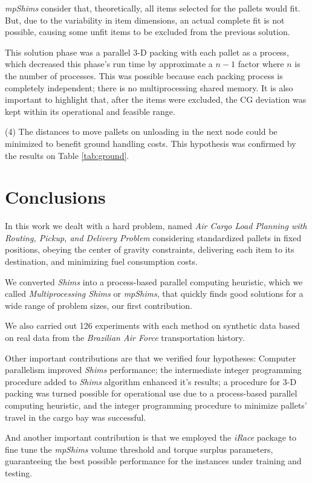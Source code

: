 \documentclass[preprint,authoryear]{elsarticle}
\begin{document}
{\it mpShims} consider that, theoretically, all items selected for the pallets would fit. But, due to the variability in item dimensions, an actual complete fit is not possible, causing some unfit items to be excluded from the previous solution.

This solution phase was a parallel 3-D packing with each pallet as a process, which decreased this phase's run time by approximate a $n-1$ factor where $n$ is the number of processes. This was possible because each packing process is completely independent; there is no multiprocessing shared memory. It is also important to highlight that, after the items were excluded, the CG deviation was kept within its operational and feasible range.

(4) The distances to move pallets on unloading in the next node could be minimized to benefit ground handling costs.
This hypothesis was confirmed by the results on Table \ref{tab:ground}.


\section{Conclusions}
\label{sec7}

In this work we dealt with a hard problem, named {\it Air Cargo Load Planning with Routing, Pickup, and Delivery Problem} considering standardized pallets in fixed positions, obeying the center of gravity constraints, delivering each item to its destination, and minimizing fuel consumption costs.

We converted {\it Shims} into a process-based parallel computing heuristic, which we called {\it Multiprocessing Shims} or {\it mpShims}, that quickly finds good solutions for a wide range of problem sizes, our first contribution.

We also carried out 126 experiments with each method on synthetic data based on real data from the {\it Brazilian Air Force} transportation history.

Other important contributions are that we verified four hypotheses: Computer parallelism improved {\it Shims} performance; the intermediate integer programming procedure added to {\it Shims} algorithm enhanced it's results; a procedure for 3-D packing was turned possible for operational use due to a process-based parallel computing heuristic, and the integer programming procedure to minimize pallets' travel in the cargo bay was successful.

And another important contribution is that we employed the {\it iRace} package to fine tune the {\it mpShims} volume threshold and torque surplus parameters, guaranteeing the best possible performance for the instances under training and testing.
\end{document}
